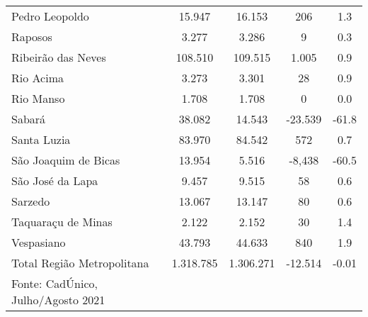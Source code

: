 \documentclass[12pt]{article}
\begin{document}
\begin{table}[htbp]
\begin{adjustbox}{max width=\linewidth}
\begin{tabular}{lcccc}
    Pedro Leopoldo & \textcolor[rgb]{ .2,  .2,  .2}{15.947} & \textcolor[rgb]{ .2,  .2,  .2}{16.153} & \textcolor[rgb]{ .2,  .2,  .2}{206} & 1.3 \\
    Raposos & \textcolor[rgb]{ .2,  .2,  .2}{3.277} & \textcolor[rgb]{ .2,  .2,  .2}{3.286} & \textcolor[rgb]{ .2,  .2,  .2}{9} & 0.3 \\
    Ribeirão das Neves & \textcolor[rgb]{ .2,  .2,  .2}{108.510} & \textcolor[rgb]{ .2,  .2,  .2}{109.515} & \textcolor[rgb]{ .2,  .2,  .2}{1.005} & 0.9 \\
    Rio Acima & \textcolor[rgb]{ .2,  .2,  .2}{3.273} & \textcolor[rgb]{ .2,  .2,  .2}{3.301} & \textcolor[rgb]{ .2,  .2,  .2}{28} & 0.9 \\
    Rio Manso & \textcolor[rgb]{ .2,  .2,  .2}{1.708} & \textcolor[rgb]{ .2,  .2,  .2}{1.708} & \textcolor[rgb]{ .2,  .2,  .2}{0} & 0.0 \\
    Sabará & \textcolor[rgb]{ .2,  .2,  .2}{38.082} & \textcolor[rgb]{ .2,  .2,  .2}{14.543} & \textcolor[rgb]{ .2,  .2,  .2}{-23.539} & -61.8 \\
    Santa Luzia & \textcolor[rgb]{ .2,  .2,  .2}{83.970} & \textcolor[rgb]{ .2,  .2,  .2}{84.542} & \textcolor[rgb]{ .2,  .2,  .2}{572} & 0.7 \\
    São Joaquim de Bicas & \textcolor[rgb]{ .2,  .2,  .2}{13.954} & \textcolor[rgb]{ .2,  .2,  .2}{5.516} & \textcolor[rgb]{ .2,  .2,  .2}{-8,438} & -60.5 \\
    São José da Lapa & \textcolor[rgb]{ .2,  .2,  .2}{9.457} & \textcolor[rgb]{ .2,  .2,  .2}{9.515} & \textcolor[rgb]{ .2,  .2,  .2}{58} & 0.6 \\
    Sarzedo & \textcolor[rgb]{ .2,  .2,  .2}{13.067} & \textcolor[rgb]{ .2,  .2,  .2}{13.147} & \textcolor[rgb]{ .2,  .2,  .2}{80} & 0.6 \\
    Taquaraçu de Minas & \textcolor[rgb]{ .2,  .2,  .2}{2.122} & \textcolor[rgb]{ .2,  .2,  .2}{2.152} & \textcolor[rgb]{ .2,  .2,  .2}{30} & 1.4 \\
    Vespasiano & \textcolor[rgb]{ .2,  .2,  .2}{43.793} & \textcolor[rgb]{ .2,  .2,  .2}{44.633} & \textcolor[rgb]{ .2,  .2,  .2}{840} & 1.9 \\
    \hline
    Total Região Metropolitana & 1.318.785 & 1.306.271 & \textcolor[rgb]{ .2,  .2,  .2}{-12.514} & -0.01 \\
     \hline
    {\small Fonte: CadÚnico, Julho/Agosto 2021} &  & & \textcolor[rgb]{ .2,  .2,  .2}{} &  \\
    \end{tabular}%
    \end{adjustbox}
  \label{tab:tab9}%
\end{table}%
\end{document}

